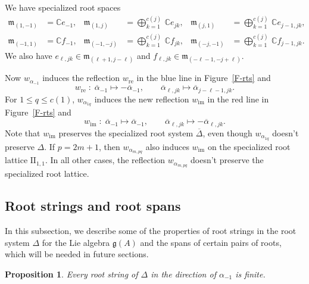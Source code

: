 \documentclass[11pt,letterpaper]{amsart}
\newcounter{thecounter}
\numberwithin{thecounter}{section}
\newtheorem{proposition}[thecounter]{Proposition}
\theoremstyle{definition}
\DeclareMathOperator{\re}{{re}}
\DeclareMathOperator{\im}{{im}}
\renewcommand{\a}{\alpha}
\newcommand{\C}{{\mathbb C}}
\begin{document}
We have  specialized root spaces
\begin{align*}
 \mathfrak{m}_{(1,-1)}& =\C e_{-1}, &
\mathfrak{m}_{(1,j)}&=\bigoplus_{k=1}^{c(j)}\,\C e_{jk}, &
\mathfrak{m}_{(j,1)}&=\bigoplus_{k=1}^{c(j)}\,\C e_{j-1,jk}, \\
 \mathfrak{m}_{(-1,1)}&= \C f_{-1},&
 \mathfrak{m}_{(-1,-j)}&=\bigoplus_{k=1}^{c(j)} \,\C f_{jk},&
 \mathfrak{m}_{(-j,-1)}&=\bigoplus_{k=1}^{c(j)} \,\C f_{j-1,jk}.
 \end{align*}
We also have 
$e_{\ell,jk}\in  %
\mathfrak{m}_{(\ell+1,j-\ell)}$
and $f_{\ell,jk}\in  %
\mathfrak{m}_{(-\ell-1,-j+\ell)}.$

Now $w_{\a_{-1}}$ induces the reflection $w_{\re}$ %
in the blue line in Figure~\ref{F-rts}
and 
$${w}_{\re}\;  :\; \overline\a_{-1}\mapsto-\overline\a_{-1}, \qquad \overline\a_{\ell,jk}\mapsto \overline\a_{j-\ell-1,jk}.$$
For $1\le q\le c(1)$,  $w_{\a_{1q}}$ induces the new reflection $w_{\im}$
in the red line in Figure~\ref{F-rts}
and 
$${w}_{\im}\;  :\; \overline\a_{-1}\mapsto\overline\a_{-1}, \qquad \overline\a_{\ell,jk}\mapsto -\overline\a_{\ell,jk}.$$
Note that $w_{\im}$ preserves the specialized root system $\overline\Delta$, even though ${w}_{\a_{1q}}$ doesn't preserve $\Delta$.
If $p=2m+1$, then $w_{\a_{m,pq}}$ also induces $w_{\im}$ on the specialized root lattice $ \text{II}_{1,1}$.
In all other cases, the reflection $w_{\a_{m,pq}}$ doesn't preserve the specialized root lattice.



\subsection{Root strings and root spans}\label{SS-strings}
In this subsection, we describe some of the properties of root strings in the root system $\Delta$ for the Lie algebra $\mathfrak{g}(A)$ and the spans of certain pairs of roots, which will be needed in future sections.
\begin{proposition}
Every root string of $\Delta$ in the direction of $\a_{-1}$ is  finite.
\end{proposition}
\end{document}
